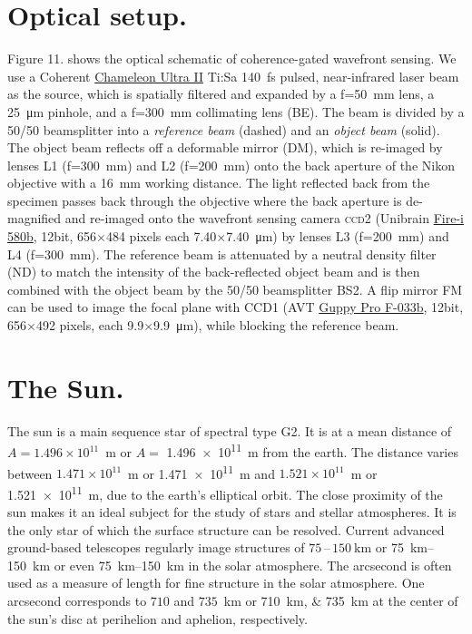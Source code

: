 \section[Optical setup]{Optical setup. \hyperlink{toc}{\hyperback}}
Figure 11. shows the optical schematic of coherence-gated wavefront sensing. We use a Coherent \href{http://www.coherent.com/products/?1842/Chameleon-Ultra-Family}{Chameleon Ultra II} Ti:Sa \SI{140}{\femto\second} pulsed, near-infrared laser beam as the source, which is spatially filtered and expanded by a f=\SI{50}{\milli\meter} lens, a \SI{25}{\micro\meter} pinhole, and a f=\SI{300}{\milli\meter} collimating lens (BE). The beam is divided by a 50/50 beamsplitter into a \emph{reference beam} (dashed) and an \emph{object beam} (solid). The object beam reflects off a deformable mirror (DM), which is re-imaged by lenses L1 (f=\SI{300}{\milli\meter}) and L2 (f=\SI{200}{\milli\meter}) onto the back aperture of the Nikon objective with a \SI{16}{\milli\meter} working distance. The  light reflected back from the specimen passes back through the objective where the back aperture is de-magnified  and re-imaged onto the wavefront sensing camera \textsc{ccd}2 (Unibrain \href{http://www.unibrain.com/products/VisionImg/Fire_i_580.htm}{Fire-i 580b}, \num{12}bit,  \num{656}$\times$\num{484} pixels each \num{7.40}$\times$\SI{7.40}{\micro\meter}) by lenses L3 (f=\SI{200}{\milli\meter}) and L4 (f=\SI{300}{\milli\meter}). The reference beam is attenuated by a neutral density filter (ND) to match the intensity of the back-reflected object beam and is then combined with the object beam by the 50/50 beamsplitter BS2. A flip mirror FM can be used to image the focal plane with CCD1 (AVT \href{http://www.alliedvisiontec.com/us/products/cameras/firewire/guppy-pro/f-033bc.html}{Guppy Pro F-033b}, \num{12}bit, \num{656}$\times$\num{492} pixels, each \num{9.9}$\times$\SI{9.9}{\micro\meter}), while blocking the reference beam.

\section[The Sun]{The Sun. \hyperlink{toc}{\hyperback}}

The sun is a main sequence star of spectral type G2.
It is at a mean distance of $A=1.496\times10^{11}$~m or $A=$ \SI{1.496e11}{\meter} from the earth.
The distance varies between $1.471\times10^{11}$~m or \SI{1.471e11}{\meter} and $1.521\times10^{11}$~m or \SI{1.521e11}{\meter}, due to the earth's elliptical orbit.
The close proximity of the sun makes it an ideal subject for the study of stars and stellar atmospheres.
It is the only star of which the surface structure can be resolved.
Current advanced ground-based telescopes regularly image structures of $75$\,--\,$\SI{150}{\kilo\meter}$ or \SIrange{75}{150}{\kilo\metre} or even \SIrange[range-phrase = --,range-units=single]{75}{150}{\kilo\metre} in the solar atmosphere.
The arcsecond is often used as a measure of length for fine structure in the solar atmosphere.
One arcsecond corresponds to $710$ and $735$~km or \SIlist{710;735}{\kilo\metre} at the center of the sun's disc at perihelion and aphelion, respectively.

